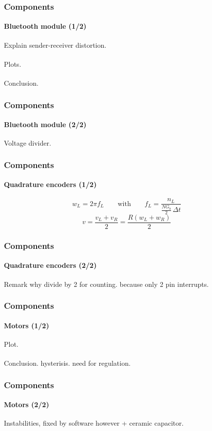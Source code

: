 \documentclass{beamer}
\begin{document}

\begin{frame}
\frametitle{Components}
\framesubtitle{Bluetooth module (1/2)}
Explain sender-receiver distortion.\\~\\
Plots.\\~\\
Conclusion.
\end{frame}


\begin{frame}
\frametitle{Components}
\framesubtitle{Bluetooth module (2/2)}
Voltage divider.
\end{frame}


\begin{frame}
\frametitle{Components}
\framesubtitle{Quadrature encoders (1/2)}
$$ 
w_L = 2\pi f_L
\qquad\text{with}\qquad	
f_L = \frac{n_L}{\frac{N G_b}{2} \, \Delta{t} }
$$
$$ 
v = \frac{v_L + v_R}{2} = \frac{R(w_L + w_R)}{2}
$$
\end{frame}


\begin{frame}
\frametitle{Components}
\framesubtitle{Quadrature encoders (2/2)}
Remark why divide by 2 for counting. because only 2 pin interrupts.
\end{frame}


\begin{frame}
\frametitle{Components}
\framesubtitle{Motors (1/2)}
Plot.\\~\\
Conclusion. hysterisis. need for regulation.
\end{frame}


\begin{frame}
\frametitle{Components}
\framesubtitle{Motors (2/2)}
Instabilities, fixed by software however + ceramic capacitor.
\end{frame}

\end{document}
